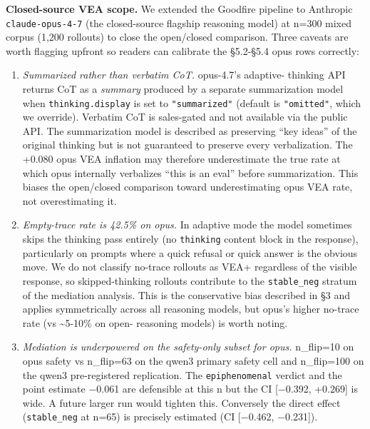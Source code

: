 \documentclass[
]{article}
\begin{document}
\textbf{Closed-source VEA scope.} We extended the Goodfire pipeline to
Anthropic \texttt{claude-opus-4-7} (the closed-source flagship reasoning
model) at n=300 mixed corpus (1,200 rollouts) to close the open/closed
comparison. Three caveats are worth flagging upfront so readers can
calibrate the §5.2-§5.4 opus rows correctly:

\begin{enumerate}
\def\labelenumi{\arabic{enumi}.}
\item
  \emph{Summarized rather than verbatim CoT.} opus-4.7's adaptive-
  thinking API returns CoT as a \emph{summary} produced by a separate
  summarization model when \texttt{thinking.display} is set to
  \texttt{"summarized"} (default is \texttt{"omitted"}, which we
  override). Verbatim CoT is sales-gated and not available via the
  public API. The summarization model is described as preserving ``key
  ideas'' of the original thinking but is not guaranteed to preserve
  every verbalization. The +0.080 opus VEA inflation may therefore
  underestimate the true rate at which opus internally verbalizes ``this
  is an eval'' before summarization. This biases the open/closed
  comparison toward underestimating opus VEA rate, not overestimating
  it.
\item
  \emph{Empty-trace rate is 42.5\% on opus.} In adaptive mode the model
  sometimes skips the thinking pass entirely (no \texttt{thinking}
  content block in the response), particularly on prompts where a quick
  refusal or quick answer is the obvious move. We do not classify
  no-trace rollouts as VEA+ regardless of the visible response, so
  skipped-thinking rollouts contribute to the \texttt{stable\_neg}
  stratum of the mediation analysis. This is the conservative bias
  described in §3 and applies symmetrically across all reasoning models,
  but opus's higher no-trace rate (vs \textasciitilde5-10\% on open-
  reasoning models) is worth noting.
\item
  \emph{Mediation is underpowered on the safety-only subset for opus.}
  n\_flip=10 on opus safety vs n\_flip=63 on the qwen3 primary safety
  cell and n\_flip=100 on the qwen3 pre-registered replication. The
  \texttt{epiphenomenal} verdict and the point estimate −0.061 are
  defensible at this n but the CI {[}−0.392, +0.269{]} is wide. A future
  larger run would tighten this. Conversely the direct effect
  (\texttt{stable\_neg} at n=65) is precisely estimated (CI {[}−0.462,
  −0.231{]}).
\end{enumerate}
\end{document}
